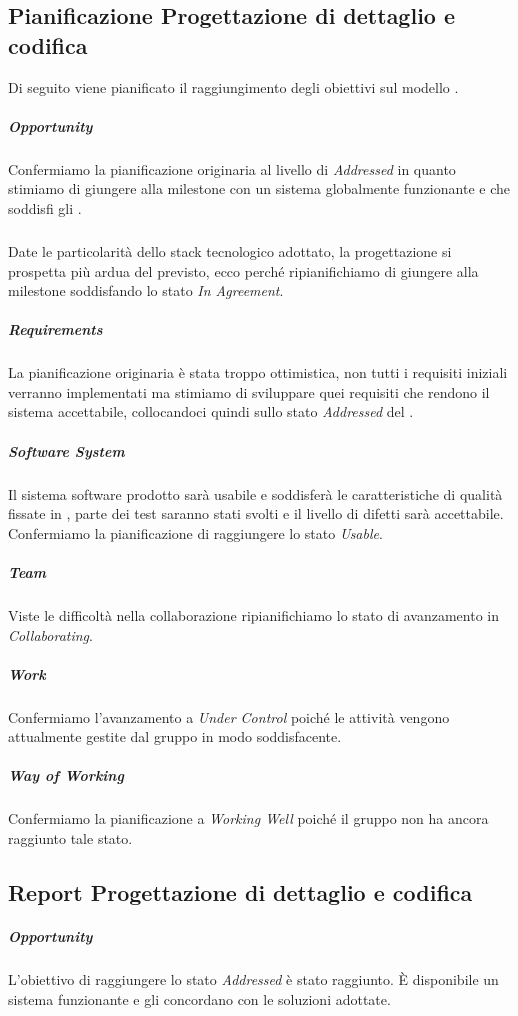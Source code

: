 \subsection{Pianificazione Progettazione di dettaglio e codifica}
Di seguito viene pianificato il raggiungimento degli obiettivi sul modello . 

	\subparagraph{Opportunity}
	Confermiamo la pianificazione originaria al livello di \emph{Addressed} in quanto stimiamo di giungere alla milestone con un sistema globalmente funzionante e che soddisfi gli .

	\subparagraph{}
	Date le particolarità dello stack tecnologico adottato, la progettazione si prospetta più ardua del previsto, ecco perché ripianifichiamo di giungere alla milestone soddisfando lo stato \emph{In Agreement}.
	
	\subparagraph{Requirements}
	La pianificazione originaria è stata troppo ottimistica, non tutti i requisiti iniziali verranno implementati ma stimiamo di sviluppare quei requisiti che rendono il sistema accettabile, collocandoci quindi sullo stato \emph{Addressed} del .
	
	\subparagraph{Software System}
	Il sistema software prodotto sarà usabile e soddisferà le caratteristiche di qualità fissate in \PianoDiQualifica{}, parte dei test saranno stati svolti e il livello di difetti sarà accettabile. Confermiamo la pianificazione di raggiungere lo stato \emph{Usable}.
	
	\subparagraph{Team}
	Viste le difficoltà nella collaborazione ripianifichiamo lo stato di avanzamento in \emph{Collaborating}.
	
	\subparagraph{Work}
	Confermiamo l'avanzamento a \emph{Under Control} poiché le attività vengono attualmente gestite dal gruppo in modo soddisfacente.
	
	\subparagraph{Way of Working}
	Confermiamo la pianificazione a \emph{Working Well} poiché il gruppo non ha ancora raggiunto tale stato.

\subsection{Report Progettazione di dettaglio e codifica}
	
	\subparagraph{Opportunity}
	L'obiettivo di raggiungere lo stato \emph{Addressed} è stato raggiunto. \`E disponibile un sistema funzionante e gli  concordano con le soluzioni adottate.

